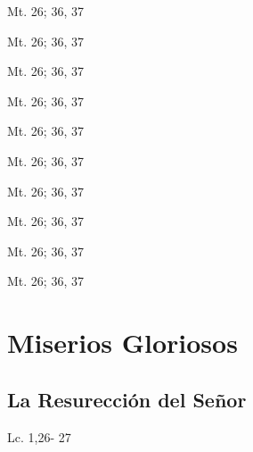 \documentclass[a4paper,11pt,sans]{article}
\begin{document}
      \begin{center}
        Mt. 26; 36, 37     
      \end{center}

      \begin{center}
        Mt. 26; 36, 37     
      \end{center}

      \begin{center}
        Mt. 26; 36, 37     
      \end{center}

      \begin{center}
        Mt. 26; 36, 37     
      \end{center}

      \begin{center}
        Mt. 26; 36, 37     
      \end{center}

      \begin{center}
        Mt. 26; 36, 37     
      \end{center}

      \begin{center}
        Mt. 26; 36, 37     
      \end{center}

      \begin{center}
        Mt. 26; 36, 37     
      \end{center}

      \begin{center}
        Mt. 26; 36, 37     
      \end{center}

      \begin{center}
        Mt. 26; 36, 37     
      \end{center}
 
    \newpage
         
  \section*{\hfil Miserios Gloriosos \hfil}
    \subsection*{\hfil La Resurección del Señor \hfil}
      \begin{multicols}{2}

      \columnbreak
                           
      \end{multicols}
      \begin{center}
        Lc. 1,26- 27           
      \end{center}
\end{document}
